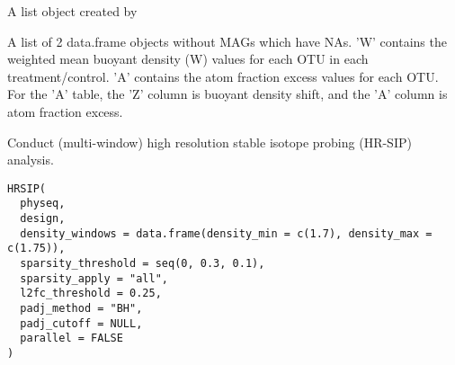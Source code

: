 \documentclass[a4paper]{book}
\begin{document}
%
\begin{Arguments}
\begin{ldescription}
\item[\code{atomX}] A list object created by 
\end{ldescription}
\end{Arguments}
%
\begin{Value}
A list of 2 data.frame objects without MAGs which have NAs. 'W' contains the weighted mean buoyant density (W) values for each OTU in each treatment/control. 'A' contains the atom fraction excess values for each OTU. For the 'A' table, the 'Z' column is buoyant density shift, and the 'A' column is atom fraction excess.
\end{Value}
%
\begin{Description}\relax
Conduct (multi-window) high resolution stable isotope probing (HR-SIP) analysis.
\end{Description}
%
\begin{Usage}
\begin{verbatim}
HRSIP(
  physeq,
  design,
  density_windows = data.frame(density_min = c(1.7), density_max = c(1.75)),
  sparsity_threshold = seq(0, 0.3, 0.1),
  sparsity_apply = "all",
  l2fc_threshold = 0.25,
  padj_method = "BH",
  padj_cutoff = NULL,
  parallel = FALSE
)
\end{verbatim}
\end{Usage}
%
\end{document}
